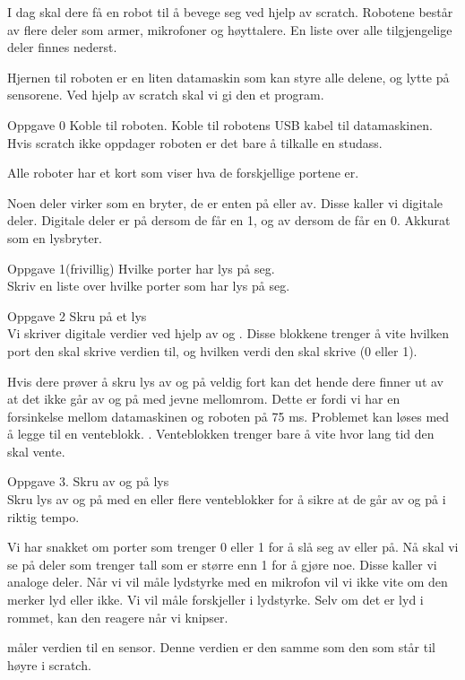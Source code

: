 \documentclass[a4paper]{article}
\newcommand{\block}[2][-0.4]{\raisebox{#1\height}{\texttt{[image: \#2]}}}
\begin{document}
\begin{large}

I dag skal dere få en robot til å bevege seg ved hjelp av scratch.
Robotene består av flere deler som armer, mikrofoner og høyttalere.
En liste over alle tilgjengelige deler finnes nederst.

Hjernen til roboten er en liten datamaskin som kan styre alle delene,
og lytte på sensorene. Ved hjelp av scratch skal vi gi den et program.

Oppgave 0 Koble til roboten.
Koble til robotens USB kabel til datamaskinen. 
Hvis scratch ikke oppdager roboten er det bare å tilkalle en studass.

\newpage
Alle roboter har et kort som viser hva de forskjellige portene er. 

Noen deler virker som en bryter, de er enten på eller av.
Disse kaller vi digitale deler. Digitale deler er på dersom 
de får en 1, og av dersom de får en 0. Akkurat som en lysbryter.

Oppgave 1(frivillig) Hvilke porter har lys på seg.\\
Skriv en liste over hvilke porter som har lys på seg.

Oppgave 2 Skru på et lys\\
Vi skriver digitale verdier ved hjelp av \block{digital_on} og \block{digital_off}.
Disse blokkene trenger å vite hvilken port den skal skrive verdien til,
og hvilken verdi den skal skrive (0 eller 1).

Hvis dere prøver å skru lys av og på veldig fort kan det hende dere finner 
ut av at det ikke går av og på med jevne mellomrom. Dette er fordi vi har en forsinkelse
mellom datamaskinen og roboten på 75 ms. Problemet kan løses med å legge til en 
venteblokk. \block{wait}. Venteblokken trenger bare å vite hvor lang tid den skal
vente. 

Oppgave 3. Skru av og på lys\\
Skru lys av og på med en eller flere venteblokker for å sikre at de går av og på
i riktig tempo.

\newpage

Vi har snakket om porter som trenger 0 eller 1 for å slå seg av eller på.
Nå skal vi se på deler som trenger tall som er større enn 1 for å gjøre noe.
Disse kaller vi analoge deler. Når vi vil måle lydstyrke med en mikrofon 
vil vi ikke vite om den merker lyd eller ikke. Vi vil måle forskjeller i lydstyrke.
Selv om det er lyd i rommet, kan den reagere når vi knipser.

\block{analog_read} måler verdien til en sensor. Denne verdien er den samme som
den som står til høyre i scratch.
\\
\block{arduino}


\end{large}
\end{document}
